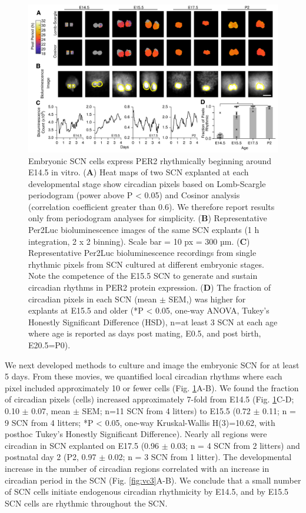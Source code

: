 \begin{figure}[p]
    \begin{center}
        \includegraphics[width=6.5in]{chap4/figures/Figure2abcd_vc.png}
    \end{center}
    \caption{\label{fig:vc2} Embryonic SCN cells express PER2 rhythmically beginning around E14.5 in vitro. (\textbf{A}) Heat maps of two SCN explanted at each developmental stage show circadian pixels based on Lomb-Scargle periodogram (power above P < 0.05) and Cosinor analysis (correlation coefficient greater than 0.6). We therefore report results only from periodogram analyses for simplicity. (\textbf{B}) Representative Per2Luc bioluminescence images of the same SCN explants (1 h integration, 2 x 2 binning). Scale bar = 10 px = 300 $µ$m. (\textbf{C}) Representative Per2Luc bioluminescence recordings from single rhythmic pixels from SCN cultured at different embryonic stages. Note the competence of the E15.5 SCN to generate and sustain circadian rhythms in PER2 protein expression. (\textbf{D}) The fraction of circadian pixels in each SCN (mean $\pm$ SEM,) was higher for explants at E15.5 and older (*P < 0.05, one-way ANOVA, Tukey's Honestly Significant Difference (HSD), n=at least 3 SCN at each age where age is reported as days post mating, E0.5, and post birth, E20.5=P0). 
    }
\end{figure}


We next developed methods to culture and image the embryonic SCN for at least 5 days.
From these movies, we quantified local circadian rhythms where each pixel included approximately 10 or fewer cells (Fig. 
\ref{fig:vc2}A-B).
We found the fraction of circadian pixels (cells) increased approximately 7-fold from E14.5 (Fig. 
\ref{fig:vc2}C-D; 0.10 $\pm$ 0.07, mean $\pm$ SEM; n=11 SCN from 4 litters) to E15.5 (0.72 $\pm$ 0.11; n = 9 SCN from 4 litters; *P < 0.05, one-way Kruskal-Wallis H(3)=10.62, with posthoc Tukey's Honestly Significant Difference).
Nearly all regions were circadian in SCN explanted on E17.5 (0.96 $\pm$ 0.03; n = 4 SCN from 2 litters) and postnatal day 2 (P2, 0.97 $\pm$ 0.02; n = 3 SCN from 1 litter).  
The developmental increase in the number of circadian regions correlated with an increase in circadian period in the SCN (Fig. 
\ref{fig:vc3}A-B).
We conclude that a small number of SCN cells initiate endogenous circadian rhythmicity by E14.5, and by E15.5 SCN cells are rhythmic throughout the SCN.

